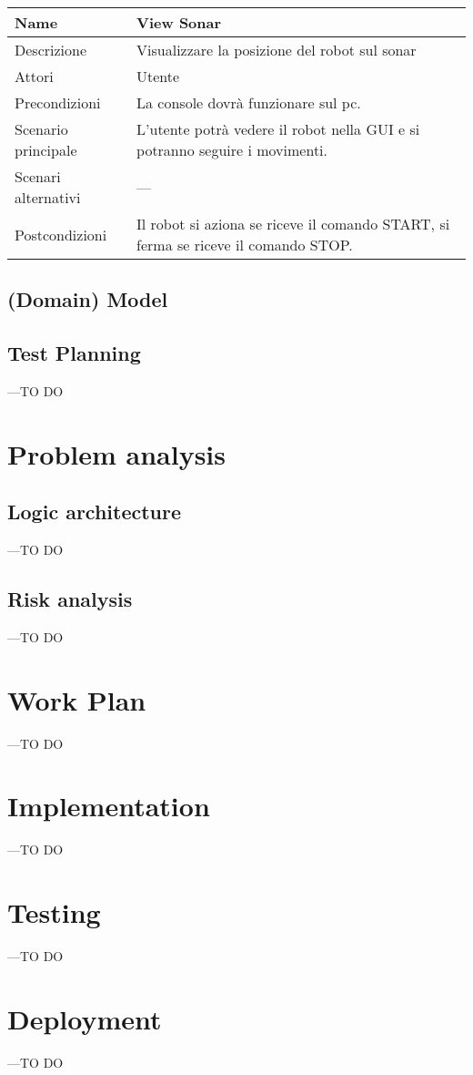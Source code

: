 \documentclass[a4paper]{article}
\begin{document}
\begin{tabular}{ | m{5cm} | m{5cm}| }
	\hline
	Name&View Sonar\\ 
	\hline	
	Descrizione&Visualizzare la posizione del robot sul sonar\\
	\hline	
	Attori&Utente\\
	\hline	
	Precondizioni&La console dovrà funzionare sul pc.\\
	\hline	
	Scenario principale&L’utente potrà vedere il robot nella GUI e si potranno seguire i movimenti.\\
	\hline	
	Scenari alternativi&---\\
	\hline	
	Postcondizioni&Il robot si aziona se riceve il comando START, si ferma se riceve il comando STOP.\\
	\hline
\end{tabular}
\subsection {(Domain) Model }

\subsection {Test Planning}
---TO DO
\section{Problem analysis }

\subsection{Logic architecture}
---TO DO

\subsection{Risk analysis}
---TO DO
\section{Work Plan}
---TO DO

\section{Implementation}
---TO DO
\section{Testing}
---TO DO
\section{Deployment}
---TO DO


\end{document}
